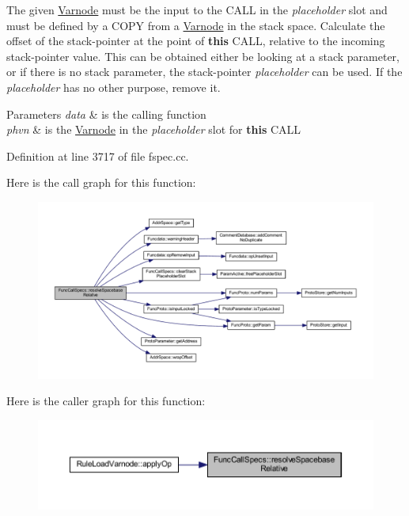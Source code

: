 The given \mbox{\hyperlink{class_varnode}{Varnode}} must be the input to the C\+A\+LL in the {\itshape placeholder} slot and must be defined by a C\+O\+PY from a \mbox{\hyperlink{class_varnode}{Varnode}} in the stack space. Calculate the offset of the stack-\/pointer at the point of {\bfseries{this}} C\+A\+LL, relative to the incoming stack-\/pointer value. This can be obtained either be looking at a stack parameter, or if there is no stack parameter, the stack-\/pointer {\itshape placeholder} can be used. If the {\itshape placeholder} has no other purpose, remove it. 
\begin{DoxyParams}{Parameters}
{\em data} & is the calling function \\
\hline
{\em phvn} & is the \mbox{\hyperlink{class_varnode}{Varnode}} in the {\itshape placeholder} slot for {\bfseries{this}} C\+A\+LL \\
\hline
\end{DoxyParams}


Definition at line 3717 of file fspec.\+cc.

Here is the call graph for this function\+:
\nopagebreak
\begin{figure}[H]
\begin{center}
\leavevmode
\includegraphics[width=350pt]{class_func_call_specs_a5ad2a3f374049dec6fdf0f9d20295305_cgraph}
\end{center}
\end{figure}
Here is the caller graph for this function\+:
\nopagebreak
\begin{figure}[H]
\begin{center}
\leavevmode
\includegraphics[width=350pt]{class_func_call_specs_a5ad2a3f374049dec6fdf0f9d20295305_icgraph}
\end{center}
\end{figure}
\mbox{\label{class_func_call_specs_a9dbc2ae7d43e62971751d96cbddf1b32}} 
